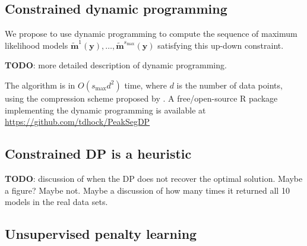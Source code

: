 \documentclass{article}
\begin{document}
\subsection{Constrained dynamic programming}
\label{sec:constrained-dp}

We propose to use dynamic programming to compute the sequence of
maximum likelihood models $\mathbf{\tilde m}^1(\mathbf y), \dots,
\mathbf{\tilde m}^{s_{\text{max}}}(\mathbf y)$ satisfying this up-down
constraint.

\textbf{TODO}: more detailed description of dynamic programming.

The algorithm is in $O(s_{\text{max}} d^2)$ time, where $d$ is the
number of data points, using the compression scheme proposed by
\citet{Segmentor}. A free/open-source R package implementing the
dynamic
programming is available at\\
\url{https://github.com/tdhock/PeakSegDP}

\subsection{Constrained DP is a heuristic}
\label{sec:dp-fails}
\textbf{TODO}: discussion of when the DP does not recover the optimal
solution. Maybe a figure? Maybe not. Maybe a discussion of how many
times it returned all 10 models in the real data sets.



\subsection{Unsupervised penalty learning}
\label{sec:supervised}
\end{document}
